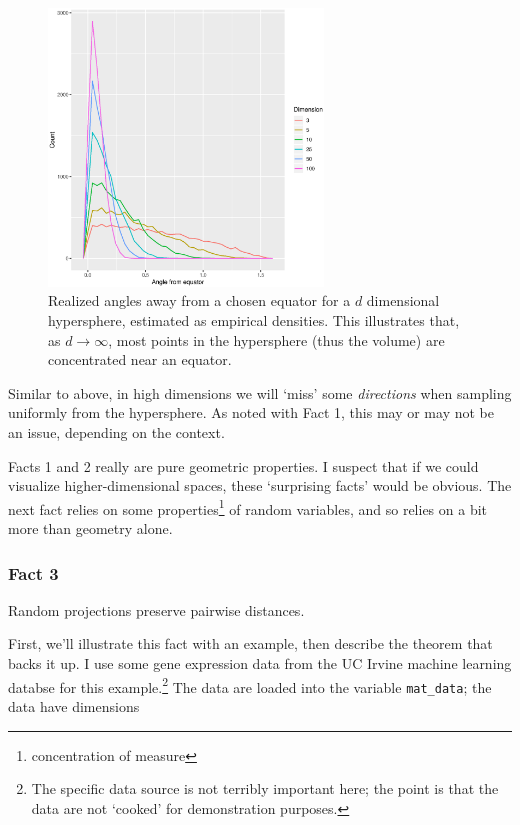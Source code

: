 \documentclass{article}
\begin{document}
\begin{figure}[!ht]
  \centering
  \includegraphics[width=0.65\textwidth]{../../images/equator}
  \caption{Realized angles away from a chosen equator for a $d$ dimensional
    hypersphere, estimated as empirical densities. This illustrates that, as
    $d\to\infty$, most points in the hypersphere (thus the volume) are
    concentrated near an equator.}
  \label{fig:equator}
\end{figure}

Similar to above, in high dimensions we will `miss' some \emph{directions} when
sampling uniformly from the hypersphere. As noted with Fact 1, this may or may
not be an issue, depending on the context.

Facts 1 and 2 really are pure geometric properties. I suspect that if we could
visualize higher-dimensional spaces, these `surprising facts' would be obvious.
The next fact relies on some properties\footnote{concentration of measure} of
random variables, and so relies on a bit more than geometry alone.

\clearpage
\subsubsection{Fact 3}
Random projections preserve pairwise distances.

\bigskip
First, we'll illustrate this fact with an example, then describe the theorem
that backs it up. I use some gene expression data from the UC Irvine machine
learning databse\cite{blake1998uci} for this example.\footnote{The specific data
  source is not terribly important here; the point is that the data are not
  `cooked' for demonstration purposes.} The data are loaded into the variable
\lstinline{mat_data}; the data have dimensions
\end{document}
